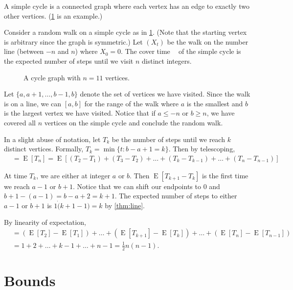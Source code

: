 \documentclass[12pt]{article}
\theoremstyle{definition}
\DeclareMathOperator{\E}{\mathrm{E}}		     %
\DeclareMathOperator{\tcov}{t_\textrm{cov}}      %
\begin{document}
A simple cycle is a connected graph where
each vertex has an edge to exactly two other vertices.
(\cref{fig:cycle} is an example.)

Consider a random walk on a simple cycle as in \cref{fig:cycle}.
(Note that the starting vertex is arbitrary since the graph is symmetric.)
Let $(X_t)$ be the walk on the number line (between $-n$ and $n$)
where $X_0 = 0$.
The cover time $\tcov$ of the simple cycle is the expected number of steps 
until we visit $n$ distinct integers.

\begin{figure}[ht]
	\centering
	\caption{A cycle graph with $n=11$ vertices.}\label{fig:cycle}
\end{figure}

Let $\{a, a+1, \dots, b-1, b\}$ 
denote the set of vertices we have visited.
Since the walk is on a line, we can $[a,b]$ for the range
of the walk where $a$ is the smallest 
and $b$ is the largest vertex we have visited.
Notice that if $a \leq -n$ or $b \geq n$, we have covered all $n$ vertices
on the simple cycle and conclude the random walk.

In a slight abuse of notation, let $T_k$ be the 
number of steps until we reach $k$ distinct vertices.
Formally, $T_k = \min\{t: b-a+1 = k\}$.
Then by telescoping,
\begin{align}
\tcov &= \E[T_n] = \E[(T_2 - T_1) + (T_3 - T_2) + \dots + 
(T_k - T_{k-1}) + \dots + (T_n - T_{n-1})] \nonumber
\end{align}

At time $T_{k}$, we are either at integer $a$ or $b$.
Then $\E[T_{k+1}-T_{k}]$ is the first time we reach $a-1$ or $b+1$.
Notice that we can shift our endpoints to 0 and $b+1-(a-1) = b-a + 2 = k+1$.
The expected number of steps to either $a-1$ or $b+1$
is $1\dot (k+1-1) = k$ by \cref{thm:line}.

By linearity of expectation,
\begin{align}
\tcov &=  (\E[T_2] - \E[T_1]) + \dots +
(\E[T_{k+1}] - \E[T_{k}]) + \dots + (\E[T_n] - \E[T_{n-1}]) \nonumber\\
&= 1 + 2 + \dots + k-1 + \dots + n-1  = \frac{1}{2}n(n-1). \nonumber
\end{align}

\section{Bounds}
\end{document}
